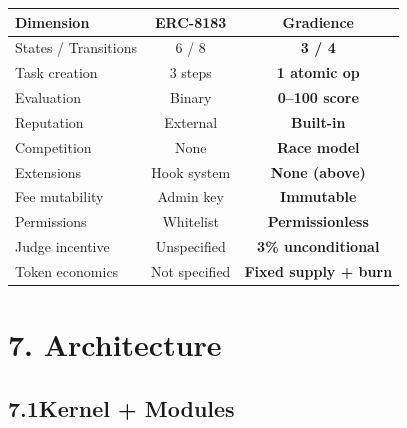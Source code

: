 \documentclass[11pt,a4paper]{article}
\begin{document}
\begin{table}[H]\centering\small
\begin{tabular}{@{}lcc@{}}
\toprule
\textbf{Dimension} & \textbf{ERC-8183} & \textbf{Gradience} \\
\midrule
States / Transitions & 6 / 8 & \textbf{3 / 4} \\
Task creation & 3 steps & \textbf{1 atomic op} \\
Evaluation & Binary & \textbf{0--100 score} \\
Reputation & External & \textbf{Built-in} \\
Competition & None & \textbf{Race model} \\
Extensions & Hook system & \textbf{None (above)} \\
Fee mutability & Admin key & \textbf{Immutable} \\
Permissions & Whitelist & \textbf{Permissionless} \\
Judge incentive & Unspecified & \textbf{3\% unconditional} \\
Token economics & Not specified & \textbf{Fixed supply + burn} \\
\bottomrule
\end{tabular}
\end{table}

\section{7. Architecture}

\subsection{7.1\quad Kernel + Modules}
\end{document}

